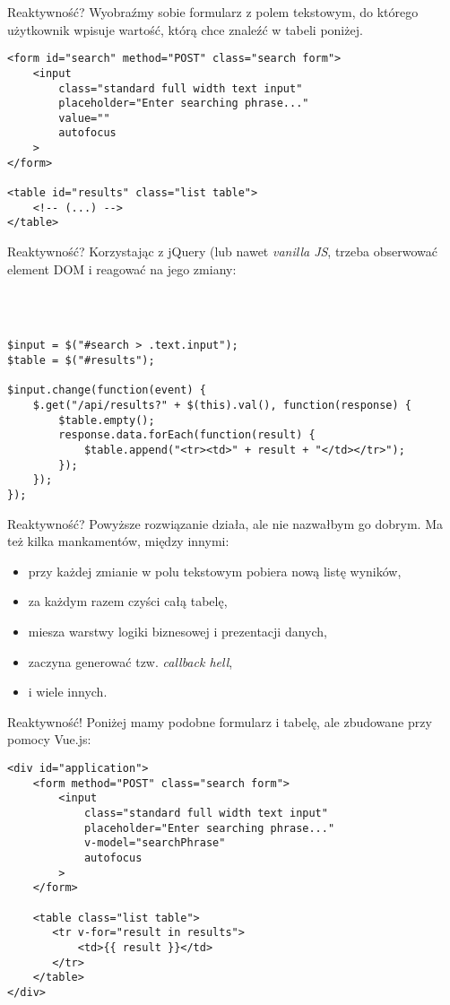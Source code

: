 \begin{frame}[fragile]{Reaktywność?}
	Wyobraźmy sobie formularz z polem tekstowym, do którego użytkownik wpisuje wartość, którą chce znaleźć w tabeli poniżej.
	
	\begin{lstlisting}
<form id="search" method="POST" class="search form">
    <input
        class="standard full width text input"
        placeholder="Enter searching phrase..."
        value=""
        autofocus
    >
</form>

<table id="results" class="list table">
    <!-- (...) -->
</table>
	\end{lstlisting}
\end{frame}

\begin{frame}[fragile]{Reaktywność?}
	Korzystając z jQuery (lub nawet \emph{vanilla JS}, trzeba obserwować element DOM i reagować na jego zmiany:
	
	\ \\ \ \\

	\begin{lstlisting}
$input = $("#search > .text.input");
$table = $("#results");

$input.change(function(event) {
    $.get("/api/results?" + $(this).val(), function(response) {
        $table.empty();
        response.data.forEach(function(result) {
            $table.append("<tr><td>" + result + "</td></tr>");
        });
    });
});
	\end{lstlisting}
\end{frame}

\begin{frame}{Reaktywność?}
	Powyższe rozwiązanie działa, ale nie nazwałbym go dobrym. Ma też kilka mankamentów, między innymi:
	\begin{itemize}
	\item przy każdej zmianie w polu tekstowym pobiera nową listę wyników,
	\item za każdym razem czyści całą tabelę,
	\item miesza warstwy logiki biznesowej i prezentacji danych,
	\item zaczyna generować tzw. \emph{callback hell},
	\item i wiele innych.
	\end{itemize}
\end{frame}

\begin{frame}[fragile]{Reaktywność!}
	Poniżej mamy podobne formularz i tabelę, ale zbudowane przy pomocy Vue.js:
	
	\begin{lstlisting}
<div id="application">
    <form method="POST" class="search form">
        <input
            class="standard full width text input"
            placeholder="Enter searching phrase..."
            v-model="searchPhrase"
            autofocus
        >
    </form>

    <table class="list table">
       <tr v-for="result in results">
           <td>{{ result }}</td>
       </tr>
    </table>
</div>
	\end{lstlisting}
\end{frame}

